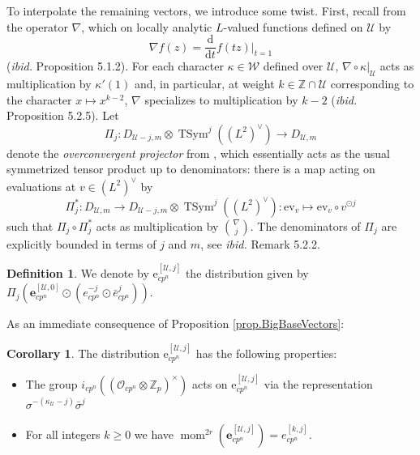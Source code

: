 \documentclass[a4paper]{amsart}
\numberwithin{equation}{section}
\theoremstyle{definition}
\newtheorem{corollary}[theorem]{Corollary}
\newtheorem{definition}[theorem]{Definition}
\newcommand{\Z}{\mathbb{Z}}
\DeclareMathOperator{\TSym}{TSym}
\begin{document}
To interpolate the remaining vectors, we introduce some twist. First, recall from \cite[\S 5.1]{LoefflerZerbes.Rankin} the operator $\nabla$, which on locally analytic $L$-valued functions defined on $\mathscr{U}$ by \[\nabla f(z)=\dfrac{\mathrm{d}}{\mathrm{d}t}f(tz)\Big|_{t=1}\] (\textit{ibid.} Proposition 5.1.2). For each character $\kappa\in\mathscr{W}$ defined over $\mathscr{U}$, $\nabla\circ\kappa|_{\mathscr{U}}$ acts as multiplication by $\kappa'(1)$ and, in particular, at weight $k\in\Z\cap\mathscr{U}$ corresponding to the character $x\mapsto x^{k-2}$, $\nabla$ specializes to multiplication by $k-2$ (\textit{ibid.} Proposition 5.2.5). Let \[\Pi_j\colon D_{\mathscr{U}-j,m}\otimes\TSym^j\left((L^2)^\vee\right)\longrightarrow D_{\mathscr{U},m}\]denote the \textit{overconvergent projector} from \cite[Corollary 5.2.1]{LoefflerZerbes.Rankin}, which essentially acts as the usual symmetrized tensor product up to denominators: there is a map acting on evaluations at $v\in (L^2)^\vee$ by \[\Pi_j^*\colon D_{\mathscr{U},m}\longrightarrow D_{\mathscr{U}-j,m}\otimes\TSym^j\left((L^2)^\vee\right)\colon\mathrm{ev}_v\mapsto\mathrm{ev}_v\circ v^{\odot j}\] such that $\Pi_j\circ\Pi_j^*$ acts as multiplication by $\binom{\nabla}{j}$. The denominators of $\Pi_j$ are explicitly bounded in terms of $j$ and $m$, see \textit{ibid.} Remark 5.2.2.

\begin{definition}
We denote by $\boldsymbol{\mathrm{e}}_{cp^n}^{[\mathscr{U},j]}$ the distribution given by $\Pi_j(\mathbf{e}_{cp^n}^{[\mathscr{U},0]}\odot (e_{cp^n}^{-j}\odot\bar{e}_{cp^n}^{j}))$.
\end{definition}

As an immediate consequence of Proposition \ref{prop.BigBaseVectors}:

\begin{corollary}\label{cor.BigBaseVectorsj}
The distribution $\boldsymbol{\mathrm{e}}_{cp^n}^{[\mathscr{U},j]}$ has the following properties: 
\begin{itemize}
\item The group $i_{cp^n}((\mathcal{O}_{cp^n}\otimes\Z_p)^\times)$ acts on 
$\boldsymbol{\mathrm{e}}_{cp^n}^{[\mathscr{U},j]}$ via the 
representation $\sigma^{-(\kappa_\mathscr{U}-j)}\bar{\sigma}^{j}$ 
\item For all integers $k\geq 0$ we have 
 $\operatorname{mom}^{2r}(\mathbf{e}^{[\mathscr{U},j]}_{cp^n})=e^{[k,j]}_{cp^n}.$
\end{itemize}
\end{corollary}
\end{document}
